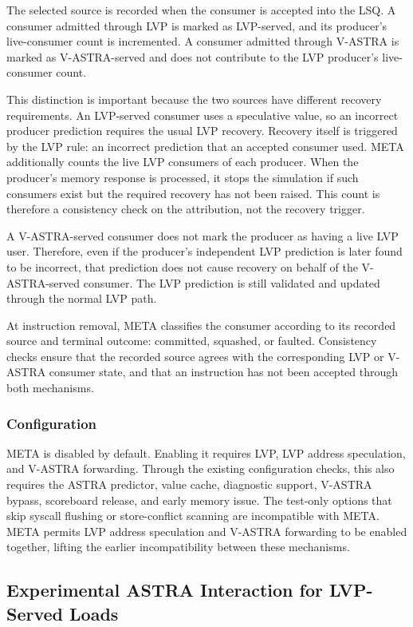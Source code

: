 The selected source is recorded when the consumer is accepted
into the LSQ. A consumer admitted through LVP is
marked as LVP-served, and its producer's live-consumer count
is incremented. A consumer admitted through V-ASTRA is marked
as V-ASTRA-served and does not contribute to the LVP
producer's live-consumer count.

This distinction is important because the two sources have
different recovery requirements. An LVP-served consumer uses
a speculative value, so an incorrect producer prediction
requires the usual LVP recovery. Recovery itself is triggered by
the LVP rule: an incorrect prediction that an accepted consumer
used. META additionally counts the live LVP consumers of each
producer. When the producer's memory response is processed, it stops
the simulation if such consumers exist but the required recovery
has not been raised. This count is therefore a consistency check
on the attribution, not the recovery trigger.

A V-ASTRA-served consumer does not mark the producer as having
a live LVP user. Therefore, even if the producer's independent
LVP prediction is later found to be incorrect, that prediction
does not cause recovery on behalf of the V-ASTRA-served
consumer. The LVP prediction is still validated and updated
through the normal LVP path.

At instruction removal, META classifies the consumer according
to its recorded source and terminal outcome: committed,
squashed, or faulted. Consistency checks ensure that the
recorded source agrees with the corresponding LVP or V-ASTRA
consumer state, and that an instruction has not been accepted
through both mechanisms.

\subsubsection{Configuration}

META is disabled by default. Enabling it requires LVP,
LVP address speculation, and V-ASTRA forwarding. Through the
existing configuration checks, this also requires the ASTRA
predictor, value cache, diagnostic support, V-ASTRA bypass,
scoreboard release, and early memory issue. The test-only
options that skip syscall flushing or store-conflict scanning
are incompatible with META. META permits LVP address speculation
and V-ASTRA forwarding to be enabled together, lifting the earlier
incompatibility between these mechanisms.

\subsection{Experimental ASTRA Interaction for LVP-Served Loads}
\label{sec:impl-provisional}


